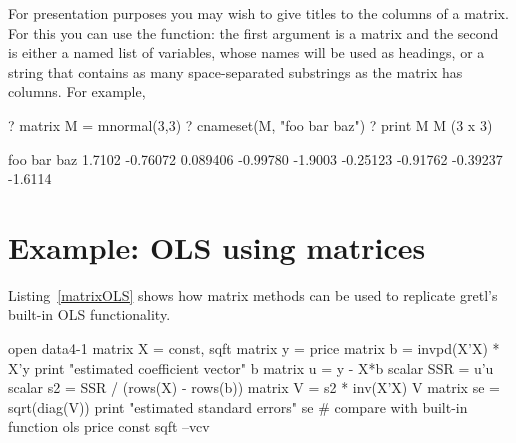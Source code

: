 For presentation purposes you may wish to give titles to the columns
of a matrix.  For this you can use the  function: the first
argument is a matrix and the second is either a named list of variables,
whose names will be used as headings, or a string that contains as many
space-separated substrings as the matrix has columns.  For example,
%
\begin{code}
? matrix M = mnormal(3,3)
? cnameset(M, "foo bar baz")
? print M
M (3 x 3)

         foo          bar          baz 
      1.7102     -0.76072     0.089406 
    -0.99780      -1.9003     -0.25123 
    -0.91762     -0.39237      -1.6114
\end{code}


\section{Example: OLS using matrices}
\label{matrix-example}

Listing~\ref{matrixOLS} shows how matrix methods can be used to
replicate gretl's built-in OLS functionality.

\begin{script}[htbp]
  \label{matrixOLS}
\begin{scode}
open data4-1
matrix X = { const, sqft }
matrix y = { price }
matrix b = invpd(X'X) * X'y
print "estimated coefficient vector"
b
matrix u = y - X*b
scalar SSR = u'u
scalar s2 = SSR / (rows(X) - rows(b))
matrix V = s2 * inv(X'X)
V
matrix se = sqrt(diag(V))
print "estimated standard errors"
se
# compare with built-in function
ols price const sqft --vcv
\end{scode}
\end{script}

